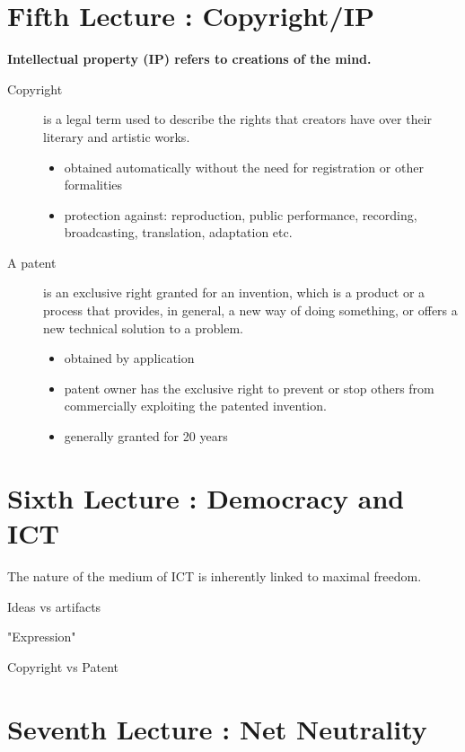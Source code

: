 \documentclass[a4paper]{article}
\begin{document}
\section{Fifth Lecture : Copyright/IP}

\textbf{Intellectual property (IP) refers to creations of the mind.}

\begin{description}
\item[Copyright] is a legal term used to describe the rights that creators have over their literary and artistic works. 
\begin{itemize}
\item obtained automatically without the need for registration or other formalities
\item protection against: reproduction, public performance, recording, broadcasting, translation, adaptation etc.
\end{itemize}

\item[A patent] is an exclusive right granted for an invention, which is a product or a process that provides, in general, a new way of doing something, or offers a new technical solution to a problem.
\begin{itemize}
\item obtained by application
\item patent owner has the exclusive right to prevent or stop others from commercially exploiting the patented invention.
\item generally granted for 20 years
\end{itemize}
\end{description}

\section{Sixth Lecture : Democracy and ICT}

The nature of the medium of ICT is inherently linked to maximal freedom.

Ideas vs artifacts

"Expression"

Copyright vs Patent

\section{Seventh Lecture : Net Neutrality}


\end{document}
